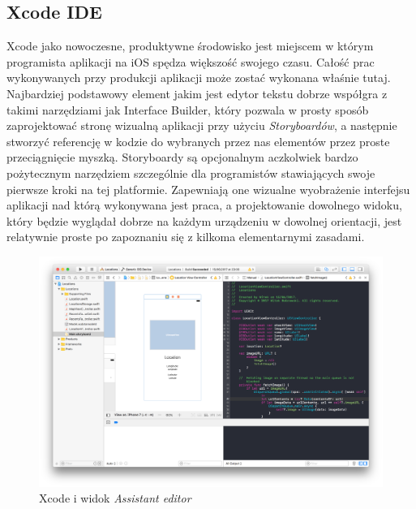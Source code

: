 \subsection{Xcode IDE}

Xcode jako nowoczesne, produktywne środowisko jest miejscem w którym programista aplikacji na iOS spędza większość swojego czasu. Całość prac wykonywanych przy produkcji aplikacji może zostać wykonana właśnie tutaj. Najbardziej podstawowy element jakim jest edytor tekstu dobrze współgra z takimi narzędziami jak Interface Builder, który pozwala w prosty sposób zaprojektować stronę wizualną aplikacji przy użyciu \textit{Storyboardów}, a następnie stworzyć referencję w kodzie do wybranych przez nas elementów przez proste przeciągnięcie myszką. Storyboardy są opcjonalnym aczkolwiek bardzo pożytecznym narzędziem szczególnie dla programistów stawiających swoje pierwsze kroki na tej platformie. Zapewniają one wizualne wyobrażenie interfejsu aplikacji nad którą wykonywana jest praca, a projektowanie dowolnego widoku, który będzie wyglądał dobrze na każdym urządzeniu w dowolnej orientacji, jest relatywnie proste po zapoznaniu się z kilkoma elementarnymi zasadami.

\begin{figure}[ht!]
  \centering
  \includegraphics[width=120mm]{images/chapter-2-image-2-xcode.png}
  \caption{Xcode i widok \textit{Assistant editor}}
\end{figure}


